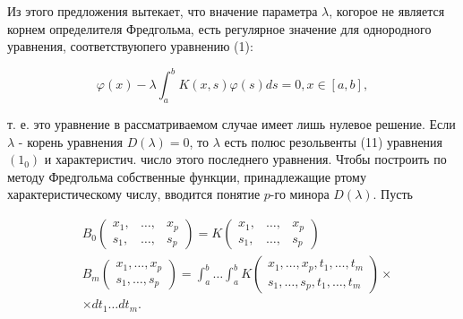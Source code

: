 \documentclass[10pt]{article}
\begin{document}
Из этого предложения вытекает, что вначение параметра $\lambda$, когорое не является корнем определителя Фредгольма, есть регулярное значение для однородного уравнения, соответствуюпего уравнению (1):



\[

\varphi(x)-\lambda \int_{a}^{b} K(x, s) \varphi(s) d s=0, x \in[a, b],

\]



т. е. это уравнение в рассматриваемом случае имеет лишь нулевое решение. Если $\lambda$ - корень уравнения $D(\lambda)=0$, то $\lambda$ есть полюс резольвенты (11) уравнения $\left(1_{0}\right)$ и характеристич. число этого последнего уравнения. Чтобы построить по методу Фредгольма собственные функции, принадлежащие ртому характеристическому числу, вводится понятие $p$-го минора $D(\lambda)$. Пусть



\[

\begin{aligned}

& B_{0}\left(\begin{array}{ccc}

x_{1}, & \ldots, & x_{p} \\

s_{1}, & \ldots, & s_{p}

\end{array}\right)=K\left(\begin{array}{lll}

x_{1}, & \ldots, & x_{p} \\

s_{1}, & \ldots, & s_{p}

\end{array}\right) \\

& B_{m}\left(\begin{array}{c}

x_{1}, \ldots, x_{p} \\

s_{1}, \ldots, s_{p}

\end{array}\right)=\int_{a}^{b} \ldots \int_{a}^{b} K\left(\begin{array}{c}

x_{1}, \ldots, x_{p}, t_{1}, \ldots, t_{m} \\

s_{1}, \ldots, s_{p}, t_{1}, \ldots, t_{m}

\end{array}\right) \times \\

& \times d t_{1} \ldots d t_{m} \text {. }

\end{aligned}

\]
\end{document}
